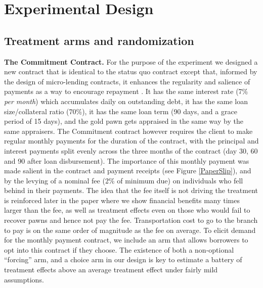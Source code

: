 \documentclass[oneside,11pt]{article}
\begin{document}
\section{Experimental Design} \label{Design}

\subsection{Treatment arms and randomization}

\noindent \textbf{The Commitment Contract.} For the purpose of the experiment we designed a new contract that is identical to the status quo contract except that, informed by the design of micro-lending contracts, it enhances the regularity and salience of payments as a way to encourage repayment \citep{morduch1999microfinance, bauer2012behavioral}.  It has the same interest rate (7\% \textit{per month}) which accumulates daily on outstanding debt, it has the same loan size/collateral ratio (70\%), it has the same loan term (90 days, and a grace period of 15 days), and the gold pawn gets appraised in the same way by the same appraisers. The Commitment contract however requires the client to make regular monthly payments for the duration of the contract, with the principal and interest payments split evenly across the three months of the contract (day 30, 60 and 90 after loan disbursement). The importance of this monthly payment was made salient in the contract and payment receipts (see Figure \ref{PaperSlip}), and by the levying of a nominal fee (2\% of minimum due) on individuals who fell behind in their payments.  The idea that the fee itself is not driving the treatment is reinforced later in the paper where we show financial benefits many times larger than the fee, as well as treatment effects even on those who would fail to recover pawns and hence not pay the fee. Transportation cost to go to the branch to pay is on the same order of magnitude as the fee on average.
To elicit demand for the monthly payment contract, we include an arm that allows borrowers to opt into this contract if they choose. The existence of both a non-optional ``forcing'' arm, and a choice arm in our design is key to estimate a battery of treatment effects above an average treatment effect under fairly mild assumptions.
\end{document}
